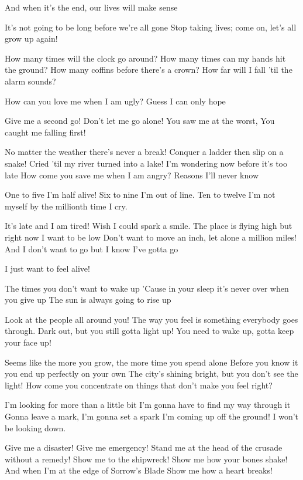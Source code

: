 And when it's the end, our lives will make sense

It's not going to be long before we're all gone
Stop taking lives; come on, let's all grow up again!


How many times will the clock go around?
How many times can my hands hit the ground?
How many coffins before there's a crown?
How far will I fall 'til the alarm sounds?

How can you love me when I am ugly?
Guess I can only hope

Give me a second go!
Don't let me go alone!
You saw me at the worst, You caught me falling first!

No matter the weather there's never a break!
Conquer a ladder then slip on a snake!
Cried 'til my river turned into a lake!
I'm wondering now before it's too late
How come you save me when I am angry?
Reasons I'll never know

One to five I'm half alive!
Six to nine I'm out of line.
Ten to twelve I'm not myself by the millionth time I cry.


It's late and I am tired!
Wish I could spark a smile.
The place is flying high but right now I want to be low
Don't want to move an inch, let alone a million miles!
And I don't want to go but I know I've gotta go

I just want to feel alive!

The times you don't want to wake up
'Cause in your sleep it's never over when you give up
The sun is always going to rise up

Look at the people all around you!
The way you feel is something everybody goes through.
Dark out, but you still gotta light up!
You need to wake up, gotta keep your face up!

Seems like the more you grow, the more time you spend alone
Before you know it you end up perfectly on your own
The city's shining bright, but you don't see the light!
How come you concentrate on things that don't make you feel right?

I'm looking for more than a little bit
I'm gonna have to find my way through it
Gonna leave a mark, I'm gonna set a spark
I'm coming up off the ground!
I won't be looking down.


Give me a disaster!
Give me emergency!
Stand me at the head of the crusade without a remedy!
Show me to the shipwreck!
Show me how your bones shake!
And when I'm at the edge of Sorrow's Blade
Show me how a heart breaks!

